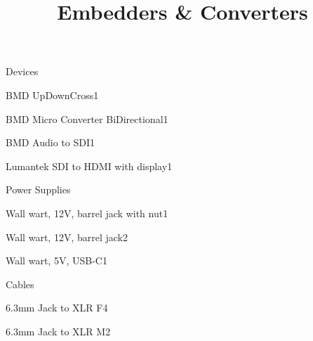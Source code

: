 \def\papersize{5}




\title{Embedders \& Converters}

\begin{checklist}{Devices}
  \item{BMD UpDownCross}{1}
  \item{BMD Micro Converter BiDirectional}{1}
  \item{BMD Audio to SDI}{1}
  \item{Lumantek SDI to HDMI with display}{1}
\end{checklist}

\begin{checklist}{Power Supplies}
  \item{Wall wart, 12V, barrel jack with nut}{1}
  \item{Wall wart, 12V, barrel jack}{2}
  \item{Wall wart, 5V, USB-C}{1}
\end{checklist}

\begin{checklist}{Cables}
  \item{6.3mm Jack to XLR F}{4}
  \item{6.3mm Jack to XLR M}{2}
\end{checklist}


